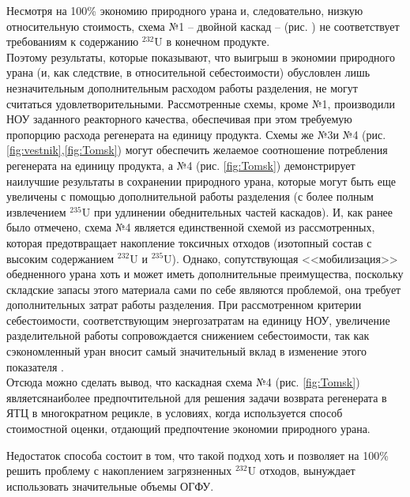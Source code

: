 Несмотря на 100\% экономию природного урана и, следовательно, низкую относительную стоимость, схема №1  -- двойной каскад -- (рис. ) не соответствует требованиям к содержанию $^{232}$U в конечном продукте.\\
Поэтому результаты, которые показывают, что выигрыш в экономии природного урана (и, как следствие, в относительной себестоимости) обусловлен лишь незначительным дополнительным расходом работы разделения, не могут считаться удовлетворительными.
Рассмотренные схемы, кроме №1, производили НОУ заданного реакторного качества, обеспечивая при этом требуемую пропорцию расхода регенерата на единицу продукта.
Схемы же №3и №4 (рис. \ref{fig:vestnik},\ref{fig:Tomsk}) могут обеспечить желаемое соотношение потребления регенерата на единицу продукта, а №4 (рис. \ref{fig:Tomsk}) демонстрирует наилучшие результаты в сохранении природного урана, которые могут быть еще увеличены с помощью дополнительной работы разделения (с более полным извлечением $^{235}$U при удлинении обеднительных частей каскадов).
И, как ранее было отмечено, схема №4 является единственной схемой из рассмотренных, которая предотвращает накопление токсичных отходов (изотопный состав с высоким содержанием $^{232}$U и $^{235}$U).
Однако, сопутствующая <<мобилизация>> обедненного урана хоть и может иметь дополнительные преимущества, поскольку складские запасы этого материала сами по себе являются проблемой, она требует дополнительных затрат работы разделения\cite{fitchOPTIONSDISPOSALREAPPLICATION2009}.
При рассмотренном критерии себестоимости, соответствующим энергозатратам на единицу НОУ, увеличение разделительной работы сопровождается снижением себестоимости, так как сэкономленный уран вносит самый значительный вклад в изменение этого показателя \cite{gusevMultycascadeEnrichmentSchemes2020}. \\
Отсюда можно сделать вывод, что каскадная схема №4 (рис. \ref{fig:Tomsk}) являетсянаиболее предпочтительной для решения задачи возврата регенерата в ЯТЦ в многократном рецикле, в условиях, когда используется способ стоимостной оценки, отдающий предпочтение экономии природного урана.

Недостаток способа состоит в том, что такой подход хоть и позволяет на 100\% решить проблему с накоплением загрязненных $^{232}$U отходов, вынуждает использовать значительные объемы ОГФУ.


